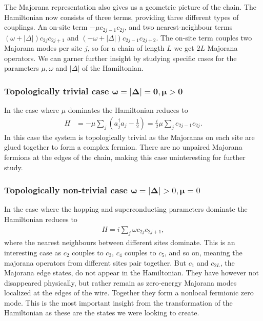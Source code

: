 The Majorana representation also gives us a geometric picture of the chain. The Hamiltonian now consists of three terms, providing three different types of couplings. An on-site term $-\mu c_{2j-1} c_{2j}$, and two nearest-neighbour terms $(\omega + |\Delta|)c_{2j} c_{2j+1}$ and $(-\omega + |\Delta|) c_{2j-1} c_{2j+2}$. The on-site term couples two Majorana modes per site $j$, so for a chain of length $L$ we get $2L$ Majorana operators. We can garner further insight by studying specific cases for the parameters $\mu, \omega$ and $|\Delta|$ of the Hamiltonian.

\subsubsection{Topologically trivial case \texorpdfstring{$\boldsymbol{\omega = |\Delta| = 0, \mu > 0}$} {$\omega = |\Delta| = 0, \mu > 0$}}
In the case where $\mu$ dominates the Hamiltonian reduces to
\begin{align}
    H &= -\mu \sum_j \left(a_j^\dagger a_j - \frac{1}{2} \right) = \frac{i}{2} \mu \sum_j c_{2j-1}c_{2j}.
\end{align}
In this case the system is topologically trivial as the Majoranas on each site are glued together to form a complex fermion. There are no unpaired Majorana fermions at the edges of the chain, making this case uninteresting for further study.

\subsubsection{Topologically non-trivial case $\boldsymbol{\omega} = \boldsymbol{|\Delta|} > 0, \boldsymbol{\mu} = 0$}
In the case where the hopping and superconducting parameters dominate the Hamiltonian reduces to
\begin{align}
  H = i\sum_{j} \omega c_{2j} c_{2j+1}, \label{eq:H_tdelta_mu0}  
\end{align}
where the nearest neighbours between different sites dominate. This is an interesting case as $c_2$ couples to $c_3$, $c_4$ couples to $c_5$, and so on, meaning the majorana operators from different sites pair together. But $c_1$ and $c_{2L}$, the Majorana edge states, do not appear in the Hamiltonian. They have however not disappeared physically, but rather remain as zero-energy Majorana modes localized at the edges of the wire. Together they form a nonlocal fermionic zero mode. This is the most important insight from the transformation of the Hamiltonian as these are the states we were looking to create.

